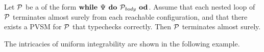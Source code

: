 \begin{theorem}
\label{thm:holger-comp}
Let $\mathcal{P}$ be a \PP{} of the form $\textbf{while } \Psi \textbf{ do } 
\mathcal{P}_{\mathit{body}} \textbf{ od}$. Assume that each nested loop of $\mathcal{P}$ 
terminates almost surely from each reachable configuration, and that there 
exists a PVSM for $\mathcal{P}$ that typechecks correctly. Then $\mathcal{P}$ 
terminates almost surely.
\end{theorem}


The intricacies of uniform integrability are shown in the following example.

